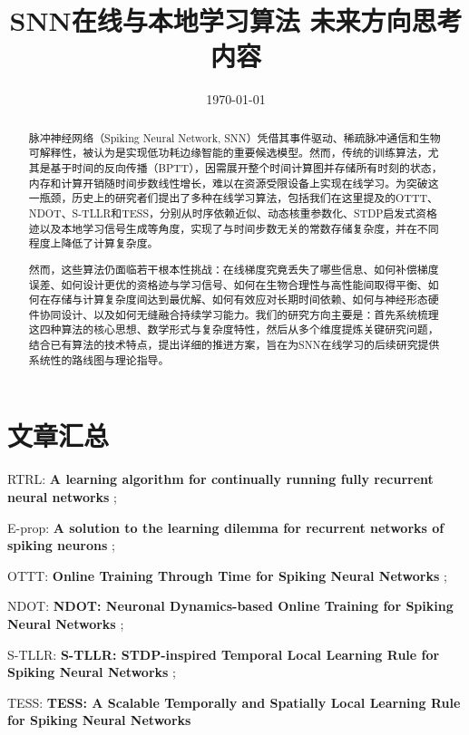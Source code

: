 \documentclass[journal,12pt,onecolumn]{IEEEtran}
\begin{document}
\title{SNN在线与本地学习算法 未来方向思考内容}
\author{}
\date{\today}
\maketitle

\begin{abstract}
脉冲神经网络（Spiking Neural Network, SNN）凭借其事件驱动、稀疏脉冲通信和生物可解释性，被认为是实现低功耗边缘智能的重要候选模型。然而，传统的训练算法，尤其是基于时间的反向传播（BPTT），因需展开整个时间计算图并存储所有时刻的状态，内存和计算开销随时间步数线性增长，难以在资源受限设备上实现在线学习。为突破这一瓶颈，历史上的研究者们提出了多种在线学习算法，包括我们在这里提及的OTTT、NDOT、S-TLLR和TESS，分别从时序依赖近似、动态核重参数化、STDP启发式资格迹以及本地学习信号生成等角度，实现了与时间步数无关的常数存储复杂度，并在不同程度上降低了计算复杂度。

然而，这些算法仍面临若干根本性挑战：在线梯度究竟丢失了哪些信息、如何补偿梯度误差、如何设计更优的资格迹与学习信号、如何在生物合理性与高性能间取得平衡、如何在存储与计算复杂度间达到最优解、如何有效应对长期时间依赖、如何与神经形态硬件协同设计、以及如何无缝融合持续学习能力。我们的研究方向主要是：首先系统梳理这四种算法的核心思想、数学形式与复杂度特性，然后从多个维度提炼关键研究问题，结合已有算法的技术特点，提出详细的推进方案，旨在为SNN在线学习的后续研究提供系统性的路线图与理论指导。

\end{abstract}

\section*{文章汇总}

RTRL: \textbf{A learning algorithm for continually running fully recurrent neural networks} \cite{williams1989learning};

E-prop: \textbf{A solution to the learning dilemma for recurrent networks of spiking neurons} \cite{bellec_solution_2020};

OTTT: \textbf{Online Training Through Time for Spiking Neural Networks} \cite{xiao_online_2022};

NDOT: \textbf{NDOT: Neuronal Dynamics-based Online Training for Spiking Neural Networks} \cite{jiang_ndot_nodate};

S-TLLR: \textbf{S-TLLR: STDP-inspired Temporal Local Learning Rule for Spiking Neural Networks} \cite{apolinario_s-tllr_2024};

TESS: \textbf{TESS: A Scalable Temporally and Spatially Local Learning Rule for Spiking Neural Networks} \cite{apolinario_tess_2025}
\end{document}
